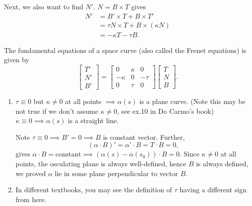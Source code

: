 Next, we also want to find \(N'\). \(N=B\times T\) gives
\begin{align*}
    N'&= B'\times T+B\times T' \\
    &= \tau N\times T+B\times (\kappa N) \\
    &= -\kappa T-\tau B
.\end{align*}
\begin{theorem}
    The fundamental equations of a space curve (also called the Frenet equations)
    is given by
    \begin{equation}\label{eq:frenet3}
        \begin{bmatrix}
            T'\\ N'\\ B'
        \end{bmatrix}=\begin{bmatrix}
            0 & \kappa & 0 \\
            -\kappa & 0 & -\tau \\
            0 & \tau & 0
        \end{bmatrix}\begin{bmatrix}
            T\\ N\\ B
        \end{bmatrix}
    .\end{equation}
\end{theorem}

\begin{remark}\hfill
\begin{enumerate}[(1)]
    \item \(\tau\equiv 0\) but \(\kappa\neq 0\) at all points \(\implies \alpha(s)\)
    is a plane curve. (Note this may be not true if we don't assume \(\kappa\neq 0\),
    see ex.10 in Do Carmo's book) \\
    \(\kappa\equiv 0\implies \alpha(s)\) is a straight line.

    Note \(\tau\equiv 0\implies B'=0\implies B\) is constant vector. Further, \[
        (\alpha\cdot B)'=\alpha'\cdot B=T\cdot B=0,
    \] gives \(\alpha\cdot B=\text{constant}\implies (\alpha(s)-\alpha(s_0))
    \cdot B=0\). Since \(\kappa\neq 0\) at all points, the osculating plane
    is always well-defined, hence \(B\) is always defined, we proved \(\alpha\) lie
    in some plane perpendicular to vector \(B\).
    \item In different textbooks, you may see the definition of \(\tau\) having a
        different sign from here.
\end{enumerate}
\end{remark}

